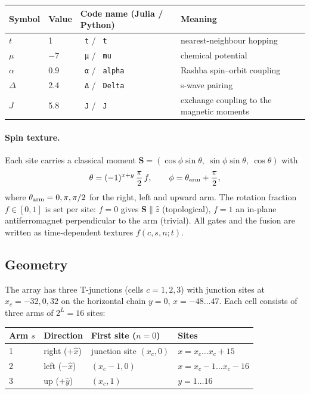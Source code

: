 \documentclass[11pt]{article}
\renewcommand{\code}[1]{\texttt{\hyphenchar\font=-1 #1}}
\begin{document}
\begin{center}
\begin{tabular}{llll}
\toprule
Symbol & Value & Code name (Julia / Python) & Meaning\\
\midrule
$t$ & 1 & \code{t} / \code{t} & nearest-neighbour hopping\\
$\mu$ & $-7$ & \code{μ} / \code{mu} & chemical potential\\
$\alpha$ & 0.9 & \code{α} / \code{alpha} & Rashba spin--orbit coupling\\
$\Delta$ & 2.4 & \code{Δ} / \code{Delta} & s-wave pairing\\
$J$ & 5.8 & \code{J} / \code{J} & exchange coupling to the magnetic moments\\
\bottomrule
\end{tabular}
\end{center}

\paragraph{Spin texture.} Each site carries a classical moment
$\mathbf S = (\cos\phi\sin\theta,\ \sin\phi\sin\theta,\ \cos\theta)$ with
\[
\theta = (-1)^{x+y}\,\frac{\pi}{2}\,f, \qquad \phi = \theta_{\rm arm} + \frac{\pi}{2},
\]
where $\theta_{\rm arm} = 0, \pi, \pi/2$ for the right, left and upward arm. The rotation fraction $f\in[0,1]$ is set per site:
$f = 0$ gives $\mathbf S\parallel\hat z$ (topological), $f = 1$ an in-plane antiferromagnet perpendicular to the arm (trivial).
All gates and the fusion are written as time-dependent textures $f(c, s, n; t)$.

\subsection{Geometry}

The array has three T-junctions (cells $c = 1, 2, 3$) with junction sites at $x_c = -32, 0, 32$ on the horizontal chain $y = 0$,
$x = -48\dots47$. Each cell consists of three arms of $2^L = 16$ sites:

\begin{center}
\begin{tabular}{llll}
\toprule
Arm $s$ & Direction & First site ($n=0$) & Sites\\
\midrule
1 & right ($+\hat x$) & junction site $(x_c, 0)$ & $x = x_c \dots x_c+15$\\
2 & left ($-\hat x$) & $(x_c-1, 0)$ & $x = x_c-1 \dots x_c-16$\\
3 & up ($+\hat y$) & $(x_c, 1)$ & $y = 1\dots16$\\
\bottomrule
\end{tabular}
\end{center}
\end{document}
